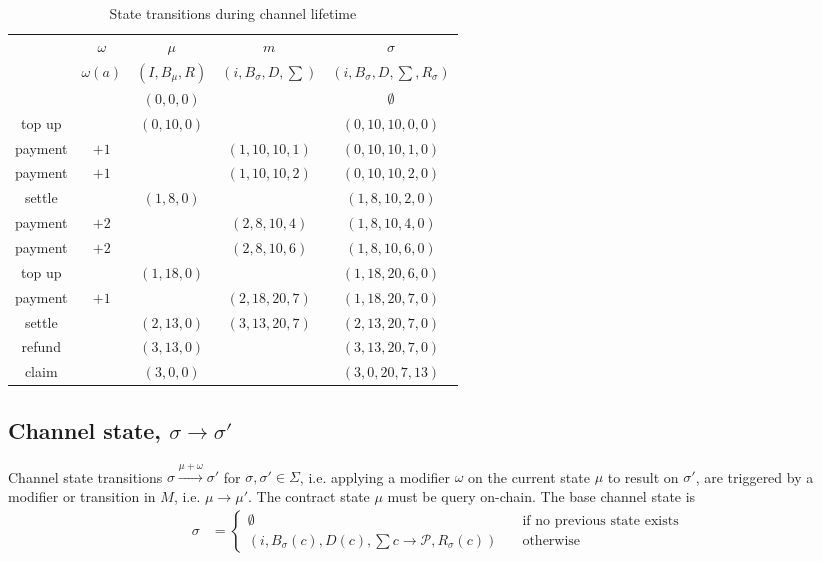 \documentclass{llncs}
\begin{document}
\begin{table}[t]
  \begin{tabularx}{\textwidth}{| S | S | C | C | C |}
       & $\omega$ & $\mu$ & $m$ & $\sigma$ \\ 
       & $\omega(a)$ & $(I,B_\mu,R)$ & $(i,B_\sigma,D,\sum)$ & $(i,B_\sigma,D,\sum,R_\sigma)$ \\
  \hhline{~====}
       & & $(0,0,0)$ & & $\emptyset$ \\ 
      top up & & $(0,10,0)$ & & $(0,10,10,0,0)$ \\
      payment & $+1$ & & $(1, 10, 10, 1)$& $(0, 10, 10, 1, 0)$ \\
      payment & $+1$ & & $(1, 10, 10, 2)$& $(0, 10, 10, 2, 0)$ \\
      settle & & $(1,8,0)$ & & $(1,8,10,2,0)$ \\
      payment & $+2$  & & $(2, 8, 10, 4)$ & $(1, 8, 10, 4, 0)$ \\
      payment & $+2$  & & $(2, 8, 10, 6)$ & $(1, 8, 10, 6, 0)$ \\
      top up & & $(1,18,0)$ & & $(1, 18, 20, 6, 0)$ \\
      payment & $+1$ & & $(2, 18, 20, 7)$ & $(1, 18, 20, 7, 0)$ \\
      settle & & $(2,13,0)$ & $(3,13,20,7)$ & $(2,13,20,7,0)$ \\
      refund & & $(3,13,0)$ & & $(3,13,20,7,0)$ \\
      claim & & $(3,0,0)$ & & $(3,0,20,7,13)$ \\
  \end{tabularx}
  \medskip
  \caption{State transitions during channel lifetime}
\end{table}

\subsection{Channel state, $\sigma \rightarrow \sigma'$} Channel state transitions $\sigma \xrightarrow{\mu + \omega} \sigma'$ for $\sigma, \sigma' \in \Sigma$, i.e. applying a modifier $\omega$ on the current state $\mu$ to result on $\sigma'$, are triggered by a modifier or transition in $M$, i.e. $\mu \rightarrow \mu'$. The contract state $\mu$ must be query on-chain. The base channel state is
\begin{equation*}
\begin{split}
  \sigma &=
  \begin{cases}
    \emptyset & \quad \text{if no previous state exists} \\
      (i, B_\sigma(c), D(c), \textstyle \sum c \rightarrow \mathcal{P},R_\sigma(c)) & \quad \text{otherwise}
  \end{cases}
\end{split}
\end{equation*}
\end{document}
